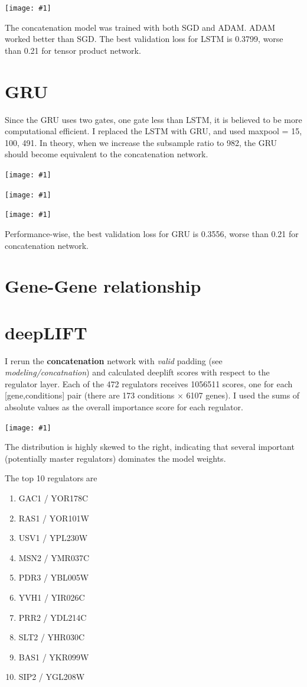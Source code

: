 \documentclass{article}
\newcommand{\includegraph}[1]{\texttt{[image: \#1]}}
\begin{document}
\includegraph{../figures/lstm/concat/model.eps}

The concatenation model was trained with both SGD and ADAM. ADAM worked better than SGD. The best validation loss for LSTM is 0.3799, worse than 0.21 for tensor product network.


\section{GRU}
Since the GRU uses two gates, one gate less than LSTM, it is believed to be more computational efficient. I replaced the LSTM with GRU, and used maxpool = {15, 100, 491}. In theory, when we increase the subsample ratio to 982, the GRU should become equivalent to the concatenation network. 

\includegraph{../figures/gru/concat/model.eps}


\includegraph{../figures/gru/concat.pool.100/model.eps}


\includegraph{../figures/gru/concat.pool.491/model.eps}

Performance-wise, the best validation loss for GRU is 0.3556, worse than 0.21 for concatenation network. 


\section{Gene-Gene relationship}

\section{deepLIFT}
I rerun the \textbf{concatenation} network with \textit{valid} padding (see \textit{modeling/concatnation}) and calculated deeplift scores with respect to the regulator layer. Each of the 472 regulators receives 1056511 scores, one for each [gene,conditions] pair (there are 173 conditions $\times$ 6107 genes). I used the sums of absolute values as the overall importance score for each regulator.


\includegraph{../figures/concatenation/concat.class.deeplift/deeplift_sum_hist.pdf}

The distribution is highly skewed to the right, indicating that several important (potentially master regulators) dominates the model weights. 

The top 10 regulators are 
\begin{enumerate}
\item GAC1 / YOR178C 
\item RAS1 / YOR101W 
\item USV1 / YPL230W 
\item MSN2 / YMR037C 
\item PDR3 / YBL005W
\item YVH1 / YIR026C
\item PRR2 / YDL214C
\item SLT2 / YHR030C
\item BAS1 / YKR099W
\item SIP2 / YGL208W 
\end{enumerate}
\end{document}
